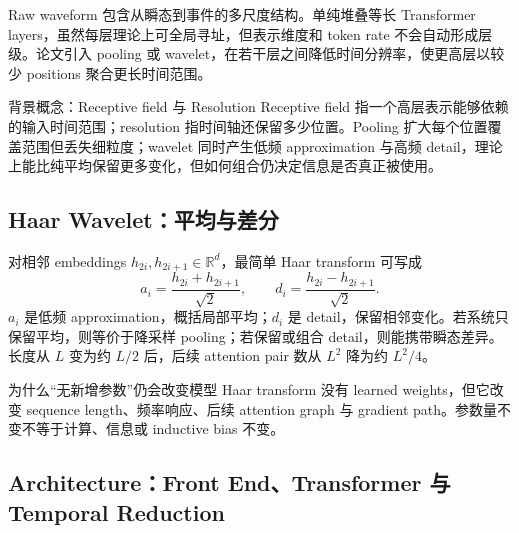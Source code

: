 Raw waveform 包含从瞬态到事件的多尺度结构。单纯堆叠等长 Transformer layers，虽然每层理论上可全局寻址，但表示维度和 token rate 不会自动形成层级。论文引入 pooling 或 wavelet，在若干层之间降低时间分辨率，使更高层以较少 positions 聚合更长时间范围。


\begin{knowledgebox}{背景概念：Receptive field 与 Resolution}
Receptive field 指一个高层表示能够依赖的输入时间范围；resolution 指时间轴还保留多少位置。Pooling 扩大每个位置覆盖范围但丢失细粒度；wavelet 同时产生低频 approximation 与高频 detail，理论上能比纯平均保留更多变化，但如何组合仍决定信息是否真正被使用。
\end{knowledgebox}


\subsection{Haar Wavelet：平均与差分}

对相邻 embeddings $h_{2i},h_{2i+1}\in\mathbb{R}^d$，最简单 Haar transform 可写成
\[
a_i=\frac{h_{2i}+h_{2i+1}}{\sqrt{2}},
\qquad
d_i=\frac{h_{2i}-h_{2i+1}}{\sqrt{2}}.
\]
$a_i$ 是低频 approximation，概括局部平均；$d_i$ 是 detail，保留相邻变化。若系统只保留平均，则等价于降采样 pooling；若保留或组合 detail，则能携带瞬态差异。长度从 $L$ 变为约 $L/2$ 后，后续 attention pair 数从 $L^2$ 降为约 $L^2/4$。


\begin{importantbox}{为什么“无新增参数”仍会改变模型}
Haar transform 没有 learned weights，但它改变 sequence length、频率响应、后续 attention graph 与 gradient path。参数量不变不等于计算、信息或 inductive bias 不变。
\end{importantbox}

\subsection{Architecture：Front End、Transformer 与 Temporal Reduction}

